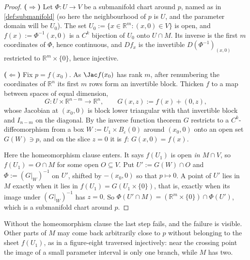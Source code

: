 \begin{proof}
\textbf{($\Rightarrow$)} Let $\Phi : U \to V$ be a submanifold chart around $p$, named as in
\cref{def:submanifold} (so here the neighbourhood of $p$ is $U$, and the parameter domain will be
$U_0$). The set $U_0 := \{x \in \mathbb{R}^m : (x,0) \in V\}$ is open, and
$f(x) := \Phi^{-1}(x,0)$ is a $C^k$ bijection of $U_0$ onto $U \cap M$. Its inverse is the first $m$ coordinates of $\Phi$, hence
continuous, and $Df_x$ is the invertible $D(\Phi^{-1})_{(x,0)}$ restricted to
$\mathbb{R}^m\times\{0\}$, hence injective.

\textbf{($\Leftarrow$)} Fix $p = f(x_0)$. As $\Jac f(x_0)$ has rank $m$, after renumbering the
coordinates of $\mathbb{R}^n$ its first $m$ rows form an invertible block. Thicken $f$ to a map
between spaces of equal dimension,
\[G : U\times\mathbb{R}^{n-m} \to \mathbb{R}^n, \qquad G(x,z) := f(x) + (0,z),\]
whose Jacobian at $(x_0,0)$ is block lower triangular with that invertible block and $I_{n-m}$ on
the diagonal. By the inverse function theorem $G$ restricts to a $C^k$-diffeomorphism from a box
$W := U_1\times B_\varepsilon(0)$ around $(x_0,0)$ onto an open set $G(W) \ni p$, and on the slice
$z = 0$ it is $f$: $G(x,0) = f(x)$.

Here the homeomorphism clause enters. It says $f(U_1)$ is open \emph{in $M \cap V$}, so
$f(U_1) = O \cap M$ for some open $O \subseteq V$. Put $U' := G(W) \cap O$ and
$\Phi := (G|_W)^{-1}$ on $U'$, shifted by $-(x_0,0)$ so that $p \mapsto 0$. A point of $U'$ lies
in $M$ exactly when it lies in $f(U_1) = G(U_1\times\{0\})$, that is, exactly when its image under
$(G|_W)^{-1}$ has $z = 0$. So $\Phi(U'\cap M) = (\mathbb{R}^m\times\{0\}) \cap \Phi(U')$, which is
a submanifold chart around $p$.
\end{proof}

Without the homeomorphism clause the last step fails, and the failure is visible. Other parts of
$M$ may come back arbitrarily close to $p$ without belonging to the sheet $f(U_1)$, as in a
figure-eight traversed injectively: near the crossing point the image of a small parameter
interval is only one branch, while $M$ has two.

